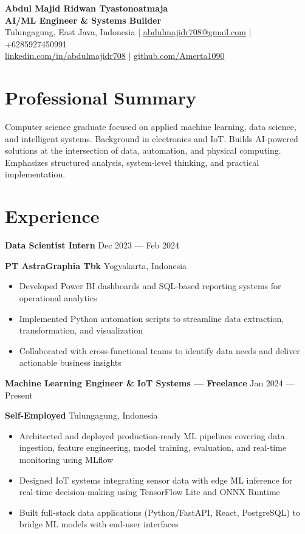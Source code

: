 \documentclass[11pt,a4paper]{article}
\newcommand{\role}[2]{%
  {\normalsize\bfseries\color{heading}#1} \hfill {\footnotesize\color{muted}#2}%
}
\newcommand{\company}[2]{%
  {\small\color{accent}\bfseries#1} \hfill {\footnotesize\color{muted}#2}%
}
\begin{document}
\begin{center}
  {\LARGE\bfseries\color{heading} Abdul Majid Ridwan Tyastonoatmaja}\\[0.2em]
  {\small\color{accent}\bfseries AI/ML Engineer \& Systems Builder}\\[0.3em]
  {\footnotesize\color{muted}
    Tulungagung, East Java, Indonesia
    $|$
    \href{mailto:abdulmajidr708@gmail.com}{abdulmajidr708@gmail.com}
    $|$
    +6285927450991
  }\\[0.1em]
  {\footnotesize\color{muted}
    \href{https://linkedin.com/in/abdulmajidr708}{linkedin.com/in/abdulmajidr708}
    $|$
    \href{https://github.com/Amerta1090}{github.com/Amerta1090}
  }
\end{center}

\vspace{0.5em}

\section{Professional Summary}
Computer science graduate focused on applied machine learning, data science, and intelligent systems. Background in electronics and IoT. Builds AI-powered solutions at the intersection of data, automation, and physical computing. Emphasizes structured analysis, system-level thinking, and practical implementation.

\section{Experience}

\role{Data Scientist Intern}{Dec 2023 --- Feb 2024}
\company{PT AstraGraphia Tbk}{Yogyakarta, Indonesia}
\begin{itemize}
  \item Developed Power BI dashboards and SQL-based reporting systems for operational analytics
  \item Implemented Python automation scripts to streamline data extraction, transformation, and visualization
  \item Collaborated with cross-functional teams to identify data needs and deliver actionable business insights
\end{itemize}

\role{Machine Learning Engineer \& IoT Systems — Freelance}{Jan 2024 --- Present}
\company{Self-Employed}{Tulungagung, Indonesia}
\begin{itemize}
  \item Architected and deployed production-ready ML pipelines covering data ingestion, feature engineering, model training, evaluation, and real-time monitoring using MLflow
  \item Designed IoT systems integrating sensor data with edge ML inference for real-time decision-making using TensorFlow Lite and ONNX Runtime
  \item Built full-stack data applications (Python/FastAPI, React, PostgreSQL) to bridge ML models with end-user interfaces
\end{itemize}
\end{document}
